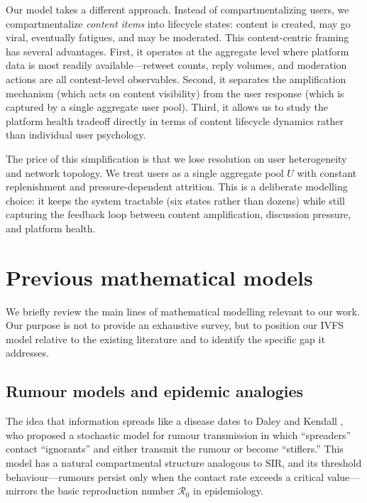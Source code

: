 \documentclass[11pt]{article}
\begin{document}
Our model takes a different approach. Instead of compartmentalizing users, we compartmentalize \emph{content items} into lifecycle states: content is created, may go viral, eventually fatigues, and may be moderated. This content-centric framing has several advantages. First, it operates at the aggregate level where platform data is most readily available---retweet counts, reply volumes, and moderation actions are all content-level observables. Second, it separates the amplification mechanism (which acts on content visibility) from the user response (which is captured by a single aggregate user pool). Third, it allows us to study the platform health tradeoff directly in terms of content lifecycle dynamics rather than individual user psychology.

The price of this simplification is that we lose resolution on user heterogeneity and network topology. We treat users as a single aggregate pool $U$ with constant replenishment and pressure-dependent attrition. This is a deliberate modelling choice: it keeps the system tractable (six states rather than dozens) while still capturing the feedback loop between content amplification, discussion pressure, and platform health.


\section{Previous mathematical models}
\label{sec:previous}

We briefly review the main lines of mathematical modelling relevant to our work. Our purpose is not to provide an exhaustive survey, but to position our IVFS model relative to the existing literature and to identify the specific gap it addresses.

\subsection{Rumour models and epidemic analogies}

The idea that information spreads like a disease dates to Daley and Kendall \cite{daleyKendall1964}, who proposed a stochastic model for rumour transmission in which ``spreaders'' contact ``ignorants'' and either transmit the rumour or become ``stiflers.'' This model has a natural compartmental structure analogous to SIR, and its threshold behaviour---rumours persist only when the contact rate exceeds a critical value---mirrors the basic reproduction number $\mathcal{R}_0$ in epidemiology.
\end{document}
